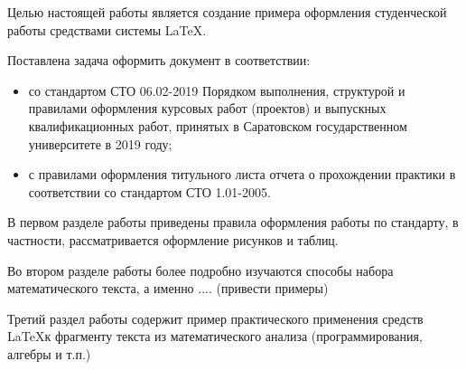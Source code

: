 \documentclass[bachelor, och, coursework, times]{SCWorks}
\begin{document}


\tableofcontents





\intro
Целью настоящей работы является создание примера оформления студенческой работы средствами системы \LaTeX.

Поставлена задача оформить документ в соответствии:
\begin{itemize}
    \item со стандартом СТО 06.02-2019 Порядком выполнения, структурой и правилами оформления курсовых работ (проектов) и выпускных квалификационных работ, принятых в Саратовском государственном университете в 2019 году;
    \item с правилами оформления титульного листа отчета о прохождении практики в соответствии со стандартом СТО 1.01-2005.
\end{itemize}
В первом разделе работы приведены правила оформления работы по стандарту, в частности, рассматривается оформление рисунков и таблиц.

Во втором разделе работы более подробно изучаются способы набора математического текста, а именно .... (привести примеры)

Третий раздел работы содержит пример практического применения средств \LaTeX к фрагменту текста из математического анализа (программирования, алгебры и т.п.)
\end{document}
